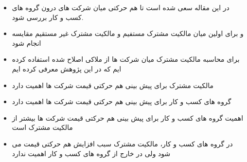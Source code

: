 \documentclass[12pt, a4paper]{article}
\begin{document}




\begin{itemize}
\item
در این مقاله سعی شده است تا هم حرکتی میان شرکت های درون گروه های کسب و کار بررسی شود.

\item 
و برای اولین میان مالکیت مشترک مستفیم و مالکیت مشترک غیر مستقیم مقایسه انجام شود

\end{itemize}
 
 
 \begin{itemize}
 \item
برای محاسبه مالکیت مشترک میان شرکت ها از ملاکی اصلاح شده استفاده کرده ایم که در این پژوهش معرفی کرده ایم

 \end{itemize}


\begin{itemize}
\item
مالکیت مشترک برای پیش بینی هم حرکتی قیمت شرکت ها اهمیت دارد
\item 
گروه های کسب و کار برای پیش بینی هم حرکتی قیمت شرکت ها اهمیت دارد
\item
اهمیت گروه های کسب و کار برای پیش بینی هم حرکتی قیمت شرکت ها بیشتر از مالکیت مشترک است
\item
 در گروه های کسب و کار، مالکیت مشترک سبب افزایش هم حرکتی قیمت می شود ولی در خارج از گروه های کسب و کار اهمیت ندارد
\end{itemize}
\end{document}
